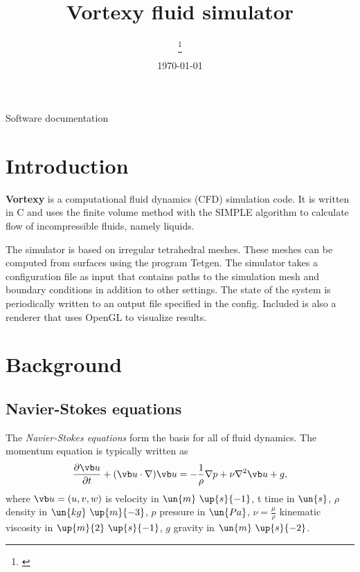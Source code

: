\documentclass[12pt]{article}
\title {
  Vortexy fluid simulator
}
\date{\today}
\author[1] {
  \firstauth\thanks{\href{mailto: \email}{\email}}
}
\begin{document}
\setlength{\belowcaptionskip}{10pt}


\normalsize

\begin{titlingpage}
  \maketitle

  \begin{center}
    Software documentation
  \end{center}
\end{titlingpage}

\newpage

\tableofcontents

\newpage

\section{Introduction}

{\bf Vortexy} is a computational fluid dynamics (CFD) simulation code. It is written in C and uses the finite volume method with the SIMPLE algorithm to calculate flow of incompressible fluids, namely liquids.

The simulator is based on irregular tetrahedral meshes. These meshes can be computed from surfaces using the program Tetgen. The simulator takes a configuration file as input that contains paths to the simulation mesh and boundary conditions in addition to other settings. The state of the system is periodically written to an output file specified in the config. Included is also a renderer that uses OpenGL to visualize results.

\section{Background}

\subsection{Navier-Stokes equations}

The \textit{Navier-Stokes equations} form the basis for all of fluid dynamics. The momentum equation is typically written as \cite[p.~59]{tri}
\begin{equation}
  \frac{\partial \vb u}{\partial t} + (\vb u \cdot \nabla) \vb u = -\frac{1}{\rho} \nabla p + \nu \nabla^2 \vb u + g,
\end{equation}
where $\vb u = (u, v, w)$ is velocity in $\un{m} \ \up{s}{-1}$, t time in $\un{s}$, $\rho$ density in $\un{kg} \ \up{m}{-3}$, $p$ pressure in $\un{Pa}$, $\nu=\frac{\mu}{\rho}$ kinematic viscosity in $\up{m}{2} \ \up{s}{-1}$, $g$ gravity in $\un{m} \ \up{s}{-2}$.
\end{document}
